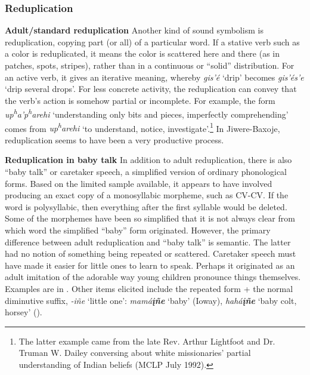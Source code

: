 \documentclass[output=paper]{LSP/langsci}
\begin{document}
\subsubsection{Reduplication}		
											
\textbf{Adult/standard reduplication}	Another kind of sound symbolism is reduplication, copying part (or all) of a particular word. If a stative verb such as a color is reduplicated, it means the color is scattered here and there (as in patches, spots, stripes), rather than in a continuous or ``solid'' distribution.  For an active verb, it gives an iterative meaning, whereby \textit{gis'\'e} `drip' becomes \textit{gis'\'es'e} `drip several drops'.  For less concrete activity, the reduplication can convey that the verb's action is somehow partial or incomplete.  For example, the form \textit{up\textsuperscript{h}a'p\textsuperscript{h}arehi} `understanding only bits and pieces, imperfectly comprehending' comes from \textit{up\textsuperscript{h}arehi} `to understand, notice, investigate'.\footnote{The latter example came from the late Rev. Arthur Lightfoot and Dr. Truman W. Dailey conversing about white missionaries' partial understanding of Indian beliefs (MCLP July 1992).}  In Jiwere-Baxoje, reduplication seems to have been a very productive process.	

\vspace{1em}														
\textbf{Reduplication in baby talk} In addition to adult reduplication, there is also ``baby talk'' or caretaker speech, a simplified version of ordinary phonological forms. Based on the limited sample available, it appears to have involved producing an exact copy of a monosyllabic morpheme, such as CV-CV.  If the word is polysyllabic, then everything after the first syllable would be deleted.  Some of the morphemes have been so simplified that it is not always clear from which word the simplified ``baby'' form originated. However, the primary difference between adult reduplication and ``baby talk'' is semantic.  The latter had no notion of something being repeated or scattered. Caretaker speech must have made it easier for little ones to learn to speak. Perhaps it originated as an adult imitation of the adorable way young children pronounce things themselves. Examples are in . 	Other items elicited include the repeated form + the normal diminutive suffix, \textit{-i\~ne} `little one':  \textit{mamá\textbf{\k{i}\~ne}} `baby' (Ioway), \textit{hahá\textbf{\k{i}\~ne}} `baby colt, horsey' (\citealt{Davidson1998}).
\end{document}
